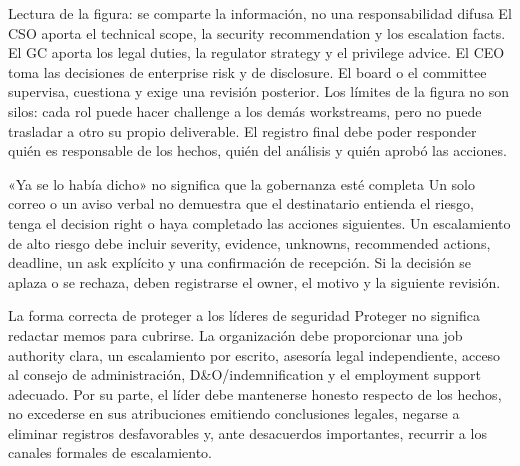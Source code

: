 \documentclass[a4paper]{article}
\begin{document}
\begin{knowledgebox}{Lectura de la figura: se comparte la información, no una responsabilidad difusa}
El CSO aporta el technical scope, la security recommendation y los escalation facts. El GC aporta los legal duties, la regulator strategy y el privilege advice. El CEO toma las decisiones de enterprise risk y de disclosure. El board o el committee supervisa, cuestiona y exige una revisión posterior. Los límites de la figura no son silos: cada rol puede hacer challenge a los demás workstreams, pero no puede trasladar a otro su propio deliverable. El registro final debe poder responder quién es responsable de los hechos, quién del análisis y quién aprobó las acciones.
\end{knowledgebox}


\begin{warningbox}{«Ya se lo había dicho» no significa que la gobernanza esté completa}
Un solo correo o un aviso verbal no demuestra que el destinatario entienda el riesgo, tenga el decision right o haya completado las acciones siguientes. Un escalamiento de alto riesgo debe incluir severity, evidence, unknowns, recommended actions, deadline, un ask explícito y una confirmación de recepción. Si la decisión se aplaza o se rechaza, deben registrarse el owner, el motivo y la siguiente revisión.
\end{warningbox}

\begin{importantbox}{La forma correcta de proteger a los líderes de seguridad}
Proteger no significa redactar memos para cubrirse. La organización debe proporcionar una job authority clara, un escalamiento por escrito, asesoría legal independiente, acceso al consejo de administración, D\&O/indemnification y el employment support adecuado. Por su parte, el líder debe mantenerse honesto respecto de los hechos, no excederse en sus atribuciones emitiendo conclusiones legales, negarse a eliminar registros desfavorables y, ante desacuerdos importantes, recurrir a los canales formales de escalamiento.
\end{importantbox}
\end{document}
